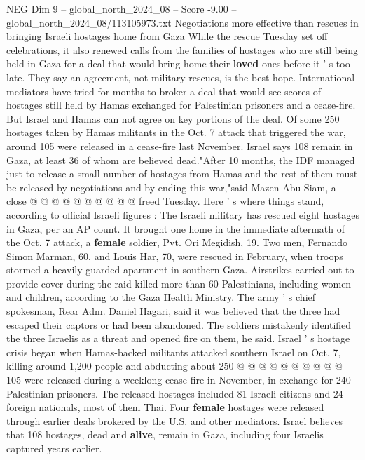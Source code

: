 \begin{textsample}{NEG Dim 9 – global\_north\_2024\_08 – Score -9.00 – global\_north\_2024\_08/113105973.txt}  \label{ex:f9_neg_082}
Negotiations more effective than rescues in bringing Israeli hostages home from Gaza While the rescue Tuesday set off celebrations, it also renewed calls from the families of hostages who are still being held in Gaza for a deal that would bring home their \textbf{loved} ones before it ' s too late.
They say an agreement, not military rescues, is the best hope.
International mediators have tried for months to broker a deal that would see scores of hostages still held by Hamas exchanged for Palestinian prisoners and a cease-fire.
But Israel and Hamas can not agree on key portions of the deal.
Of some 250 hostages taken by Hamas militants in the Oct. 7 attack that triggered the war, around 105 were released in a cease-fire last November.
Israel says 108 remain in Gaza, at least 36 of whom are believed dead."After 10 months, the IDF managed just to release a small number of hostages from Hamas and the rest of them must be released by negotiations and by ending this war,"said Mazen Abu Siam, a close @ @ @ @ @ @ @ @ @ @ freed Tuesday.
Here ' s where things stand, according to official Israeli figures : The Israeli military has rescued eight hostages in Gaza, per an AP count.
It brought one home in the immediate aftermath of the Oct. 7 attack, a \textbf{female} soldier, Pvt.
Ori Megidish, 19.
Two men, Fernando Simon Marman, 60, and Louis Har, 70, were rescued in February, when troops stormed a heavily guarded apartment in southern Gaza.
Airstrikes carried out to provide cover during the raid killed more than 60 Palestinians, including women and children, according to the Gaza Health Ministry.
The army ' s chief spokesman, Rear Adm.
Daniel Hagari, said it was believed that the three had escaped their captors or had been abandoned.
The soldiers mistakenly identified the three Israelis as a threat and opened fire on them, he said.
Israel ' s hostage crisis began when Hamas-backed militants attacked southern Israel on Oct. 7, killing around 1,200 people and abducting about 250 @ @ @ @ @ @ @ @ @ @ 105 were released during a weeklong cease-fire in November, in exchange for 240 Palestinian prisoners.
The released hostages included 81 Israeli citizens and 24 foreign nationals, most of them Thai.
Four \textbf{female} hostages were released through earlier deals brokered by the U.S. and other mediators.
Israel believes that 108 hostages, dead and \textbf{alive}, remain in Gaza, including four Israelis captured years earlier.

\end{textsample}
